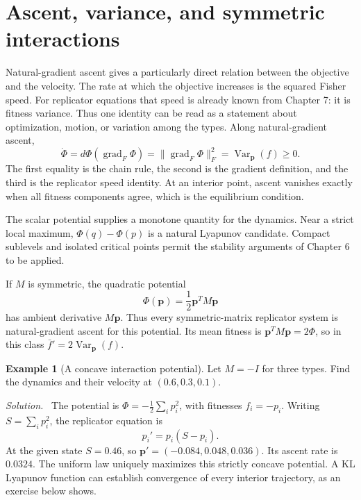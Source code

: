 \documentclass[11pt,oneside,openany]{book}
\theoremstyle{definition}
\newtheorem{example}{Example}[chapter]
\theoremstyle{remark}
\newenvironment{solution}{\par\smallskip\noindent\textit{Solution.}\ }{\par\smallskip}
\newcommand{\Var}{\operatorname{Var}}
\newcommand{\grad}{\operatorname{grad}}
\newcommand{\p}{\mathbf{p}}
\numberwithin{equation}{chapter}
\begin{document}
\section{Ascent, variance, and symmetric interactions}
Natural-gradient ascent gives a particularly direct relation between the objective and the velocity. The rate at which the objective increases is the squared Fisher speed. For replicator equations that speed is already known from Chapter 7: it is fitness variance. Thus one identity can be read as a statement about optimization, motion, or variation among the types.
Along natural-gradient ascent,
\begin{equation}\label{eq:ascentidentity}
\boxed{\dot\Phi=d\Phi(\grad_F\Phi)
=\|\grad_F\Phi\|_F^2=\Var_\p(f)\geq0.}
\end{equation}
The first equality is the chain rule, the second is the gradient definition, and the third is the replicator speed identity. At an interior point, ascent vanishes exactly when all fitness components agree, which is the equilibrium condition.

The scalar potential supplies a monotone quantity for the dynamics. Near a strict local maximum, $\Phi(q)-\Phi(p)$ is a natural Lyapunov candidate. Compact sublevels and isolated critical points permit the stability arguments of Chapter 6 to be applied.

If $M$ is symmetric, the quadratic potential
\begin{equation}\label{eq:symmetricpotential}
\Phi(\p)=\frac12\p^TM\p
\end{equation}
has ambient derivative $M\p$. Thus every symmetric-matrix replicator system is natural-gradient ascent for this potential. Its mean fitness is $\p^TM\p=2\Phi$, so in this class $\bar f'=2\Var_\p(f)$.

\begin{example}[A concave interaction potential]
Let $M=-I$ for three types. Find the dynamics and their velocity at $(0.6,0.3,0.1)$.
\begin{solution}
The potential is $\Phi=-\tfrac12\sum_i p_i^2$, with fitnesses $f_i=-p_i$. Writing $S=\sum_i p_i^2$, the replicator equation is
\[
p_i'=p_i(S-p_i).
\]
At the given state $S=0.46$, so $\p'=(-0.084,0.048,0.036)$. Its ascent rate is $0.0324$. The uniform law uniquely maximizes this strictly concave potential. A KL Lyapunov function can establish convergence of every interior trajectory, as an exercise below shows.
\end{solution}
\end{example}
\end{document}
